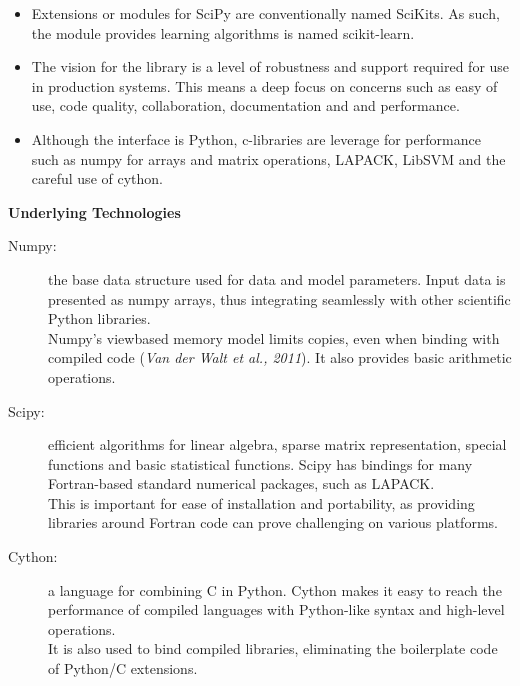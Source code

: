 \documentclass[SKL-MASTER.tex]{subfiles}
\begin{document}
\begin{itemize}
\item Extensions or modules for SciPy are conventionally named SciKits. As such, the module provides learning algorithms is named scikit-learn.

\item The vision for the library is a level of robustness and support required for use in production systems. This means a deep focus on concerns such as easy of use, code quality, collaboration, documentation and and performance.

\item Although the interface is Python, c-libraries are leverage for performance such as numpy for arrays and matrix operations, LAPACK, LibSVM and the careful use of cython.
\end{itemize}


\newpage
\noindent \textbf{Underlying Technologies}
\begin{description}
\item[Numpy:] the base data structure used for data and model parameters. Input data is presented as
numpy arrays, thus integrating seamlessly with other scientific Python libraries.\\ Numpy’s viewbased
memory model limits copies, even when binding with compiled code (\textit{Van der Walt et al.,
2011}). It also provides basic arithmetic operations.
\item[Scipy:] efficient algorithms for linear algebra, sparse matrix representation, special functions and
basic statistical functions. Scipy has bindings for many Fortran-based standard numerical packages,
such as LAPACK.\\ This is important for ease of installation and portability, as providing libraries
around Fortran code can prove challenging on various platforms.
\item[Cython:] a language for combining C in Python. Cython makes it easy to reach the performance
of compiled languages with Python-like syntax and high-level operations.\\ It is also used to bind
compiled libraries, eliminating the boilerplate code of Python/C extensions.
\end{description}
\end{document}
